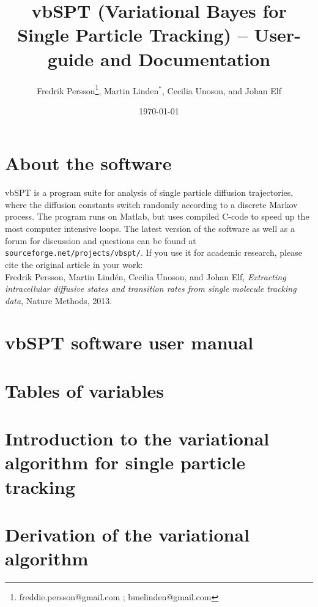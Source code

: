 \documentclass[11pt,letterpaper]{article}
\title{vbSPT (Variational Bayes for Single Particle Tracking) -- User-guide and Documentation}
\author{Fredrik Persson\footnote{freddie.persson@gmail.com ; bmelinden@gmail.com},
Martin Linden$^*$, Cecilia Unoson, and Johan Elf}
\date{\today}
\begin{document}
\maketitle 

\section*{About the software}
vbSPT is a program suite for analysis of single particle diffusion
trajectories, where the diffusion constants switch randomly according
to a discrete Markov process. The program runs on Matlab, but uses
compiled C-code to speed up the most computer intensive loops.  The
latest version of the software as well as a forum for discussion and
questions can be found at \verb+sourceforge.net/projects/vbspt/+.  If
you use it for academic research, please cite the original article in
your work:\medskip\\
\noindent Fredrik Persson, Martin Lind\'en, Cecilia Unoson, and Johan
Elf, \emph{Extracting intracellular diffusive states and transition
  rates from single molecule tracking data}, Nature Methods, 2013.


\tableofcontents
\newpage
\section{vbSPT software user manual}
\label{Sec:userManual}

\newpage
\section{Tables of variables}

\newpage
\section{Introduction to the variational algorithm for single particle tracking}
\label{Sec:statistics}

\section{Derivation of the variational algorithm}
\label{Sec:derivation}


%
% 
%




\newpage



 
\end{document}
